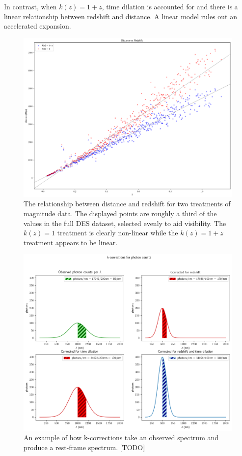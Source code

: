 \documentclass{article}
\begin{document}
In contrast, when $k(z) = 1 + z$, time dilation is accounted for and there is a
linear relationship between redshift and distance. A linear model rules out an
accelerated expansion.

\begin{figure}[h!]
  \includegraphics[width=\linewidth]{mu_distance_vs_redshift.png}
  \caption{The relationship between distance and redshift for two treatments of
  magnitude data. The displayed points are roughly a third of the values in the
  full DES dataset, selected evenly to aid visibility. The $k(z) = 1$ treatment
  is clearly non-linear while the $k(z) = 1 + z$ treatment appears to be
  linear.}
  \label{fig:mu_distance_vs_redshift}
\end{figure}

\begin{figure}[h!]
  \includegraphics[width=\linewidth]{k-corrections_for_photon_counts.png}
  \caption{An example of how k-corrections take an observed spectrum and
  produce a rest-frame spectrum. [TODO]
  }
  \label{fig:mu_distance_vs_redshift}
\end{figure}
\end{document}

